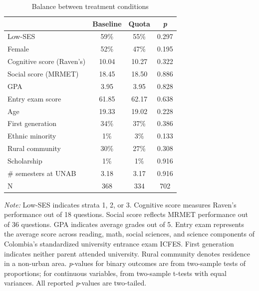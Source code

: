 \documentclass[11pt,a4paper,oneside]{article}
\begin{document}
\begin{table}[H]
\centering
\begin{threeparttable}
\caption{Balance between treatment conditions}
\begin{tabular*}{0.85\textwidth}{@{\extracolsep{\fill}}lcc c@{}}
\toprule
 & \multicolumn{1}{c}{\textbf{Baseline}} & \multicolumn{1}{c}{\textbf{Quota}} & \multicolumn{1}{c}{\textit{\textbf{p}}} \\ \midrule
Low-SES & 59\% & 55\% & \multicolumn{1}{c}{0.297} \\
Female & 52\% & 47\% & \multicolumn{1}{c}{0.195} \\
Cognitive score (Raven's) & 10.04 & 10.27 & \multicolumn{1}{c}{0.322} \\
Social score (MRMET) & 18.45 & 18.50 & \multicolumn{1}{c}{0.886} \\
GPA & 3.95 & 3.95 & \multicolumn{1}{c}{0.828} \\
Entry exam score & 61.85 & 62.17 & \multicolumn{1}{c}{0.638} \\
Age & 19.33 & 19.02 & \multicolumn{1}{c}{0.228} \\
First generation & 34\% & 37\% & \multicolumn{1}{c}{0.386} \\
Ethnic minority & 1\% & 3\% & \multicolumn{1}{c}{0.133} \\
Rural community & 30\% & 27\% & \multicolumn{1}{c}{0.308} \\
Scholarship & 1\% & 1\% & \multicolumn{1}{c}{0.916} \\
\# semesters at UNAB & 3.18 & 3.17 & \multicolumn{1}{c}{0.916} \\
\midrule
N & 368 & 334 & 702 \\
\bottomrule
\end{tabular*}
\begin{tablenotes}[flushleft]
\footnotesize
\item[] \textit{Note:} Low-SES indicates strata 1, 2, or 3. Cognitive score measures Raven's performance out of 18 questions. Social score reflects MRMET performance out of 36 questions. GPA indicates average grades out of 5. Entry exam represents the average score across reading, math, social sciences, and science components of Colombia's standardized university entrance exam ICFES. First generation indicates neither parent attended university. Rural community denotes residence in a non-urban area. \textit{p}-values for binary outcomes are from two-sample tests of proportions; for continuous variables, from two-sample t-tests with equal variances. All reported \textit{p}-values are two-tailed.
\end{tablenotes}
\label{tab:demographic-comparison}
\end{threeparttable}
\end{table}
\end{document}

